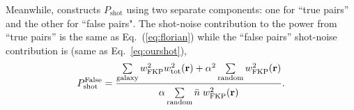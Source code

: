                                                                                                                                                                                                                                                                          Meanwhile, \cite{Gil-Marin:2014aa} constructs $P_\mathrm{shot}$ using two separate 
                                                                                                                                                                                                                                                                         components: one for ``true pairs'' and the other for ``false pairs". 
                                                                                                                                                                                                                                                                         The shot-noise contribution to the power from ``true pairs'' is the same as 
                                                                                                                                                                                                                                                                         Eq.~(\ref{eq:florian}) while the ``false pairs'' shot-noise contribution is 
                                                                                                                                                                                                                                                                         (same as Eq.~\ref{eq:ourshot}), 
                                                                                                                                                                                                                                                                         \begin{equation} \label{eq:gm_falsepairs}
                                                                                                                                                                                                                                                                         P^\mathrm{False}_\mathrm{shot} = \frac{\sum\limits_{\mathrm{galaxy}} w^2_\mathrm{FKP}w^2_\mathrm{tot}({\bf r}) + 
                                                                                                                                                                                                                                                                         \alpha^2 \sum\limits_{\mathrm{random}} w_\mathrm{FKP}^2({\bf r})}
                                                                                                                                                                                                                                                                         {\alpha \sum\limits^{ }_{\mathrm{random}} \bar{n} \; w_\mathrm{FKP}^2({\bf r})}.
                                                                                                                                                                                                                                                                         \end{equation}
